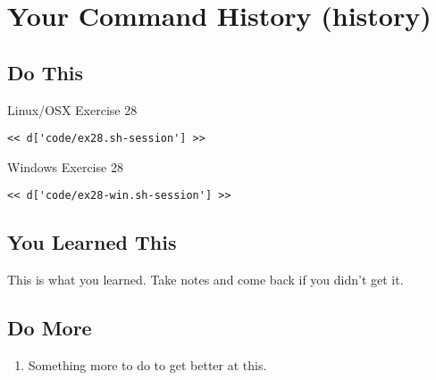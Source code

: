 \chapter{Your Command History (history)}

\section{Do This}

\begin{code}{Linux/OSX Exercise 28}
\begin{Verbatim}
<< d['code/ex28.sh-session'] >>
\end{Verbatim}
\end{code}

\begin{code}{Windows Exercise 28}
\begin{Verbatim}
<< d['code/ex28-win.sh-session'] >>
\end{Verbatim}
\end{code}

\section{You Learned This}

This is what you learned.  Take notes and come back if you didn't get it.

\section{Do More}

\begin{enumerate}
\item Something more to do to get better at this.
\end{enumerate}

